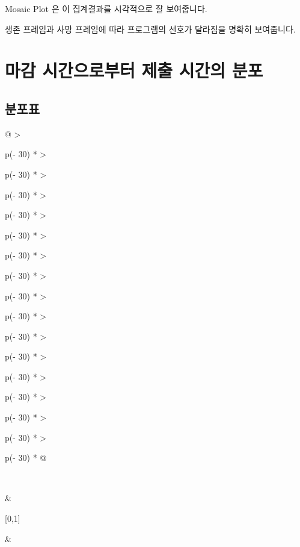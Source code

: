 \documentclass[
]{book}
\begin{document}
Mosaic Plot 은 이 집계결과를 시각적으로 잘 보여줍니다.

생존 프레임과 사망 프레임에 따라 프로그램의 선호가 달라짐을 명확히 보여줍니다.

\section{마감 시간으로부터 제출 시간의 분포}\label{uxb9c8uxac10-uxc2dcuxac04uxc73cuxb85cuxbd80uxd130-uxc81cuxcd9c-uxc2dcuxac04uxc758-uxbd84uxd3ec-12}

\subsection{분포표}\label{uxbd84uxd3ecuxd45c-13}

\begin{longtable}[]{@{}
  >{\raggedright\arraybackslash}p{(\columnwidth - 30\tabcolsep) * }
  >{\raggedright\arraybackslash}p{(\columnwidth - 30\tabcolsep) * }
  >{\raggedright\arraybackslash}p{(\columnwidth - 30\tabcolsep) * }
  >{\raggedright\arraybackslash}p{(\columnwidth - 30\tabcolsep) * }
  >{\raggedright\arraybackslash}p{(\columnwidth - 30\tabcolsep) * }
  >{\raggedright\arraybackslash}p{(\columnwidth - 30\tabcolsep) * }
  >{\raggedright\arraybackslash}p{(\columnwidth - 30\tabcolsep) * }
  >{\raggedright\arraybackslash}p{(\columnwidth - 30\tabcolsep) * }
  >{\raggedright\arraybackslash}p{(\columnwidth - 30\tabcolsep) * }
  >{\raggedright\arraybackslash}p{(\columnwidth - 30\tabcolsep) * }
  >{\raggedright\arraybackslash}p{(\columnwidth - 30\tabcolsep) * }
  >{\raggedright\arraybackslash}p{(\columnwidth - 30\tabcolsep) * }
  >{\raggedright\arraybackslash}p{(\columnwidth - 30\tabcolsep) * }
  >{\raggedright\arraybackslash}p{(\columnwidth - 30\tabcolsep) * }
  >{\raggedright\arraybackslash}p{(\columnwidth - 30\tabcolsep) * }
  >{\raggedright\arraybackslash}p{(\columnwidth - 30\tabcolsep) * }@{}}
\caption{일 단위}\tabularnewline
\toprule\noalign{}
\begin{minipage}[b]{\linewidth}\raggedright
~
\end{minipage} & \begin{minipage}[b]{\linewidth}\raggedright
{[}0,1{]}
\end{minipage} & \begin{minipage}[b]{\linewidth}\raggedright

\end{minipage}
\end{longtable}
\end{document}
